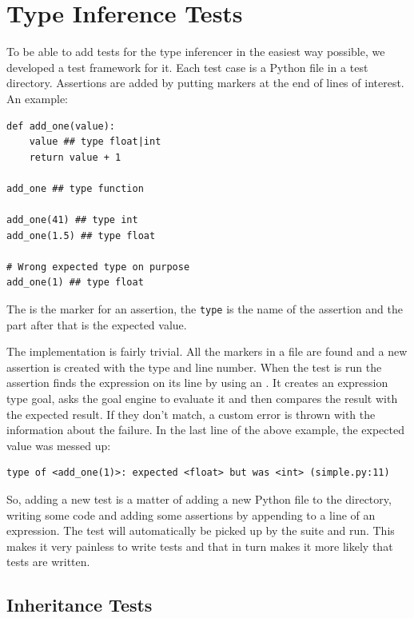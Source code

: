 \documentclass[12pt,halfparskip,DIV11,BCOR10mm]{scrreprt}
\begin{document}
\section{Type Inference Tests}


To be able to add tests for the type inferencer in the easiest way possible, we developed a test framework for it. Each test case is a Python file in a test directory. Assertions are added by putting markers at the end of lines of interest. An example:

\begin{lstlisting}
def add_one(value):
    value ## type float|int
    return value + 1

add_one ## type function

add_one(41) ## type int
add_one(1.5) ## type float

# Wrong expected type on purpose
add_one(1) ## type float
\end{lstlisting}

The \code{##} is the marker for an assertion, the \texttt{type} is the name of the assertion and the part after that is the expected value.

The implementation is fairly trivial. All the markers in a file are found and a new assertion is created with the type and line number. When the test is run the assertion finds the expression on its line by using an . It creates an expression type goal, asks the goal engine to evaluate it and then compares the result with the expected result. If they don't match, a custom error  is thrown with the information about the failure. In the last line of the above example, the expected value was messed up:

\begin{verbatim}
type of <add_one(1)>: expected <float> but was <int> (simple.py:11)
\end{verbatim}

So, adding a new test is a matter of adding a new Python file to the directory, writing some code and adding some assertions by appending  to a line of an expression. The test will automatically be picked up by the suite and run. This makes it very painless to write tests and that in turn makes it more likely that tests are written.

\subsection{Inheritance Tests}
\end{document}
